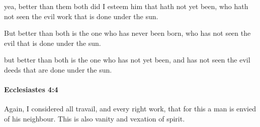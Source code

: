 			\begin{versebox}
					\item[BHS] 
					\item[LXX] 
					\item[ASV] yea, better than them both did I esteem him that hath not yet been, who hath not seen the evil work that is done under the sun.
					\item[NIV] But better than both is the one who has never been born, who has not seen the evil that is done under the sun.
					\item[NRSV] but better than both is the one who has not yet been, and has not seen the evil deeds that are done under the sun.
			\end{versebox}

		\paragraph{Ecclesiastes 4:4} %
			\label{ECCLESIASTES-4-4}

			Again, I considered all travail, and every right work, that for this a man is envied of his neighbour. This is also vanity and vexation of spirit.

